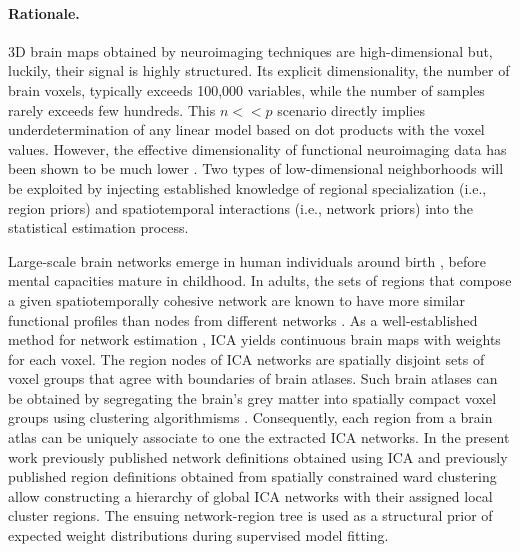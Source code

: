 \documentclass{article}
\begin{document}
\paragraph{Rationale.}
3D brain maps obtained by neuroimaging
techniques are high-dimensional but, luckily,
their signal is highly structured.
Its explicit dimensionality, the number of brain voxels,
typically exceeds 100,000 variables, while the number
of samples rarely exceeds few hundreds.
This \(n << p\) scenario directly implies underdetermination of any
linear model based on dot products with the voxel values.
However, the effective dimensionality of functional neuroimaging data has been
shown to be much lower \cite{bzdok2015semi}.
Two types of low-dimensional neighborhoods will be exploited by
injecting established knowledge of regional specialization
(i.e., region priors)
and spatiotemporal interactions
(i.e., network priors)
into the statistical estimation process.



Large-scale brain networks emerge in human individuals around birth
\cite{doria2010}, before mental capacities mature in childhood. 
In adults,
the sets of regions that compose
a given spatiotemporally cohesive network are known to have more
similar functional profiles than nodes from different networks
\cite{anderson2013}.
As a well-established method for network estimation
\cite{beckmann2005},
ICA yields continuous brain maps with
weights for each voxel. The region nodes of ICA
networks are spatially disjoint sets of voxel groups that
agree with boundaries of brain atlases.
Such brain atlases can be obtained by segregating
the brain's grey matter into spatially compact voxel groups
using clustering algorithmisms
\cite{cbp2015review}.
Consequently,
each region from a brain atlas can be uniquely associate to one
the extracted ICA networks.
%
In the present work previously published network definitions
obtained using ICA \cite{smith2009}
and
previously published region definitions obtained from
spatially constrained ward clustering \cite{crad12}
allow constructing a hierarchy of global ICA networks with their
assigned local cluster regions.
The ensuing network-region tree is used as a structural prior
of expected weight distributions
during supervised model fitting.
\end{document}
